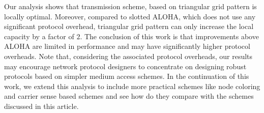 \documentclass[12pt,english]{article}
\begin{document}
Our analysis shows that transmission scheme, based on triangular grid pattern is locally optimal. Moreover, compared to slotted ALOHA, which does not use any significant protocol overhead, triangular grid pattern can only increase the local capacity by a factor of $2$. The conclusion of this work is that improvements above ALOHA are limited in performance and may have significantly higher protocol overheads. Note that, considering the associated protocol overheads, our results may encourage network protocol designers to concentrate on designing robust protocols based on simpler medium access schemes. In the continuation of this work, we extend this analysis to include more practical schemes like node coloring and carrier sense based schemes and see how do they compare with the schemes discussed in this article. 



\end{document}
